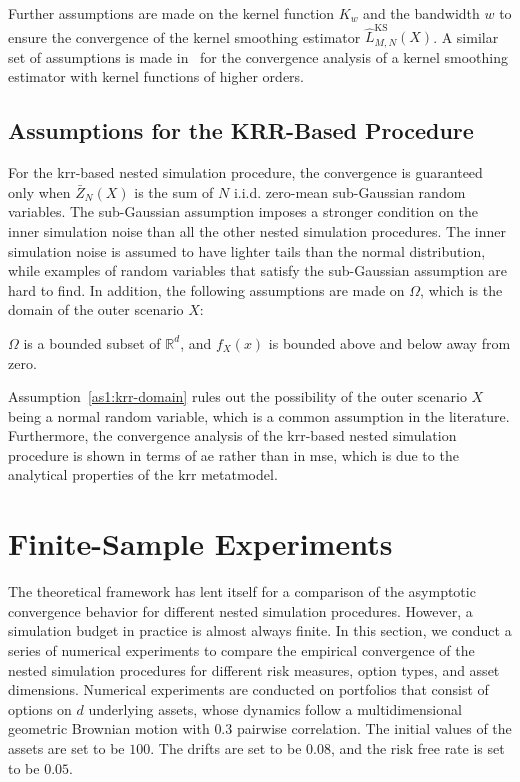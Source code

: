 Further assumptions are made on the kernel function $K_w$ and the bandwidth $w$ to ensure the convergence of the kernel smoothing estimator $\hat{L}^{\text{KS}}_{M, N}(X)$.
A similar set of assumptions is made in~\cite{jennen1988unifying} for the convergence analysis of a kernel smoothing estimator with kernel functions of higher orders.

\subsection{Assumptions for the KRR-Based Procedure}
For the \gls{krr}-based nested simulation procedure, the convergence is guaranteed only when $\bar{Z}_N(X)$ is the sum of $N$ i.i.d. zero-mean sub-Gaussian random variables.
The sub-Gaussian assumption imposes a stronger condition on the inner simulation noise than all the other nested simulation procedures.
The inner simulation noise is assumed to have lighter tails than the normal distribution, while examples of random variables that satisfy the sub-Gaussian assumption are hard to find.
In addition, the following assumptions are made on $\Omega$, which is the domain of the outer scenario $X$:

\begin{assumption}\label{as1:krr-domain}
    $\Omega$ is a bounded subset of $\mathbb{R}^d$, and $f_X(x)$ is bounded above and below away from zero.
\end{assumption}

Assumption~\ref{as1:krr-domain} rules out the possibility of the outer scenario $X$ being a normal random variable, which is a common assumption in the literature.
Furthermore, the convergence analysis of the \gls{krr}-based nested simulation procedure is shown in terms of \gls{ae} rather than in \gls{mse}, which is due to the analytical properties of the \gls{krr} metatmodel.

\section{Finite-Sample Experiments}\label{sec1:numerical-experiments}
The theoretical framework has lent itself for a comparison of the asymptotic convergence behavior for different nested simulation procedures.
However, a simulation budget in practice is almost always finite.
In this section, we conduct a series of numerical experiments to compare the empirical convergence of the nested simulation procedures for different risk measures, option types, and asset dimensions.
Numerical experiments are conducted on portfolios that consist of options on $d$ underlying assets, whose dynamics follow a multidimensional geometric Brownian motion with $0.3$ pairwise correlation.
The initial values of the assets are set to be $100$.
The drifts are set to be $0.08$, and the risk free rate is set to be $0.05$.

